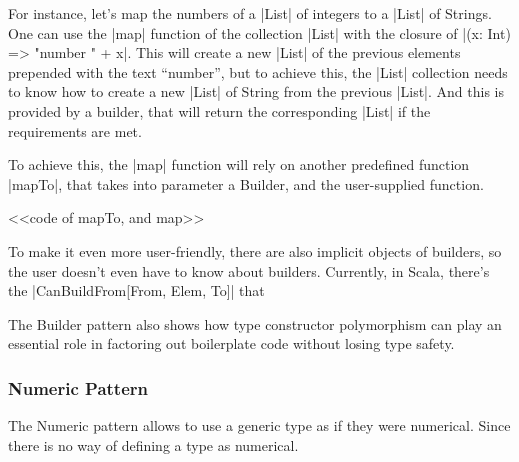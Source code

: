 
For instance, let's map the numbers of a |List| of integers to a |List| of Strings. One can use the |map| function of the collection |List| with the closure of |(x: Int) => "number " + x|. This will create a new |List| of the previous elements prepended with the text ``number'', but to achieve this, the |List| collection needs to know how to create a new |List| of String from the previous |List|. And this is provided by a builder, that will return the corresponding |List| if the requirements are met.

To achieve this, the |map| function will rely on another predefined function |mapTo|, that takes into parameter a Builder, and the user-supplied function.

<<code of mapTo, and map>>


To make it even more user-friendly, there are also implicit objects of builders, so the user doesn't even have to know about builders. Currently, in Scala, there's the |CanBuildFrom[From, Elem, To]| that 

The Builder pattern also shows how type constructor polymorphism can play an essential role in factoring out boilerplate code without losing type safety.\cite{adriaan}

\subsubsection{Numeric Pattern}

The Numeric pattern allows to use a generic type as if they were numerical.
Since there is no way of defining a type as numerical.
